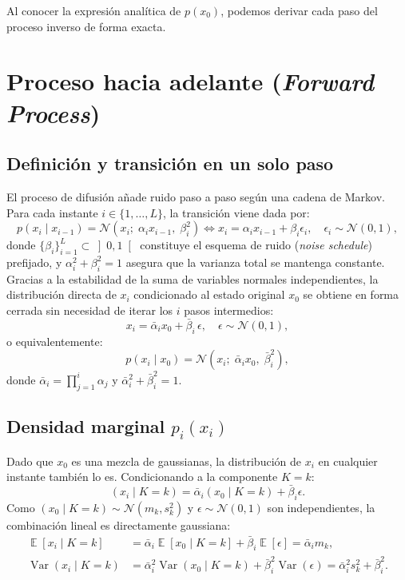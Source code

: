 \documentclass[11pt,a4paper]{article}
\DeclareMathOperator{\E}{\mathbb{E}}
\DeclareMathOperator{\Var}{Var}
\begin{document}
Al conocer la expresión analítica de $p(x_0)$, podemos derivar cada paso del proceso inverso de forma exacta.

\section{Proceso hacia adelante (\textit{Forward Process})}

\subsection{Definición y transición en un solo paso}

El proceso de difusión añade ruido paso a paso según una cadena de Markov. Para cada instante $i \in \{1, \dots, L\}$, la transición viene dada por:
\[
p(x_i \mid x_{i-1}) = \mathcal{N}\left(x_i;\; \alpha_i x_{i-1},\; \beta_i^2\right) \iff x_i = \alpha_i x_{i-1} + \beta_i \epsilon_i, \quad \epsilon_i \sim \mathcal{N}(0, 1),
\]
donde $\{\beta_i\}_{i=1}^L \subset \left]0, 1\right[$ constituye el esquema de ruido (\textit{noise schedule}) prefijado, y $\alpha_i^2+\beta_i^2 = 1$ asegura que la varianza total se mantenga constante. Gracias a la estabilidad de la suma de variables normales independientes, la distribución directa de $x_i$ condicionado al estado original $x_0$ se obtiene en forma cerrada sin necesidad de iterar los $i$ pasos intermedios:
\[
x_i = \bar{\alpha}_i x_0 + \bar{\beta}_i\,\epsilon, \quad \epsilon \sim \mathcal{N}(0, 1),
\]
o equivalentemente:
\[
p(x_i \mid x_0) = \mathcal{N}\left(x_i;\; \bar{\alpha}_i x_0,\; \bar{\beta}_i^2\right),
\]
donde $\bar{\alpha}_i = \prod\limits_{j=1}^i \alpha_j$ y $\bar{\alpha}_i^2 + \bar{\beta}_i^2 = 1$.

\subsection{Densidad marginal $p_i(x_i)$}

Dado que $x_0$ es una mezcla de gaussianas, la distribución de $x_i$ en cualquier instante también lo es. Condicionando a la componente $K = k$:
\[
(x_i \mid K = k) = \bar{\alpha}_i (x_0 \mid K = k) + \bar{\beta}_i \epsilon.
\]
Como $(x_0 \mid K = k) \sim \mathcal{N}(m_k, s_k^2)$ y $\epsilon \sim \mathcal{N}(0, 1)$ son independientes, la combinación lineal es directamente gaussiana:
\begin{align*}
    \E[x_i \mid K = k] &= \bar{\alpha}_i \E[x_0 \mid K = k] + \bar{\beta}_i \E[\epsilon] = \bar{\alpha}_i m_k, \\
    \Var(x_i \mid K = k) &= \bar{\alpha}_i^2 \Var(x_0 \mid K = k) + \bar{\beta}_i^2 \Var(\epsilon) = \bar{\alpha}_i^2 s_k^2 + \bar{\beta}_i^2.
\end{align*}
\end{document}
